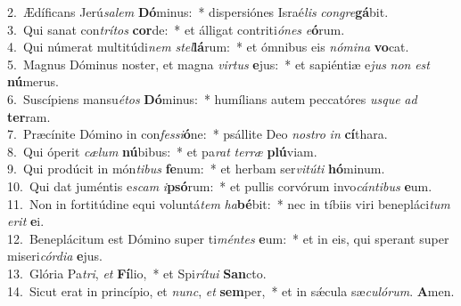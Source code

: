 {2.~}Ædíficans Jerú\textit{sa}\textit{lem} \textbf{Dó}minus:~* dispersiónes Israé\textit{lis} \textit{con}\textit{gre}\textbf{gá}bit.\\
{3.~}Qui sanat con\textit{trí}\textit{tos} \textbf{cor}de:~* et álligat contriti\textit{ó}\textit{nes} \textit{e}\textbf{ó}rum.\\
{4.~}Qui númerat multitúdi\textit{nem} \textit{stel}\textbf{lá}rum:~* et ómnibus eis \textit{nó}\textit{mi}\textit{na} \textbf{vo}cat.\\
{5.~}Magnus Dóminus noster, et magna \textit{vir}\textit{tus} \textbf{e}jus:~* et sapiéntiæ e\textit{jus} \textit{non} \textit{est} \textbf{nú}merus.\\
{6.~}Suscípiens mansu\textit{é}\textit{tos} \textbf{Dó}minus:~* humílians autem peccatóres \textit{us}\textit{que} \textit{ad} \textbf{ter}ram.\\
{7.~}Præcínite Dómino in con\textit{fes}\textit{si}\textbf{ó}ne:~* psállite Deo \textit{no}\textit{stro} \textit{in} \textbf{cí}thara.\\
{8.~}Qui óperit \textit{cæ}\textit{lum} \textbf{nú}bibus:~* et pa\textit{rat} \textit{ter}\textit{ræ} \textbf{plú}viam.\\
{9.~}Qui prodúcit in món\textit{ti}\textit{bus} \textbf{fe}num:~* et herbam ser\textit{vi}\textit{tú}\textit{ti} \textbf{hó}minum.\\
{10.~}Qui dat juméntis e\textit{scam} \textit{i}\textbf{psó}rum:~* et pullis corvórum invo\textit{cán}\textit{ti}\textit{bus} \textbf{e}um.\\
{11.~}Non in fortitúdine equi voluntá\textit{tem} \textit{ha}\textbf{bé}bit:~* nec in tíbiis viri benepláci\textit{tum} \textit{e}\textit{rit} \textbf{e}i.\\
{12.~}Beneplácitum est Dómino super ti\textit{mén}\textit{tes} \textbf{e}um:~* et in eis, qui sperant super miseri\textit{cór}\textit{di}\textit{a} \textbf{e}jus.\\
{13.~}Glória Pa\textit{tri}, \textit{et} \textbf{Fí}lio,~* et Spi\textit{rí}\textit{tu}\textit{i} \textbf{San}cto.\\
{14.~}Sicut erat in princípio, et \textit{nunc}, \textit{et} \textbf{sem}per,~* et in sǽcula sæ\textit{cu}\textit{ló}\textit{rum}. \textbf{A}men.\\

